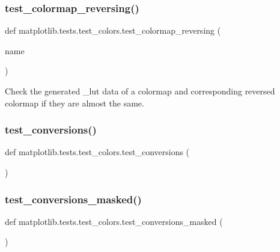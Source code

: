 \subsubsection{\texorpdfstring{test\+\_\+colormap\+\_\+reversing()}{test\_colormap\_reversing()}}
{\footnotesize\ttfamily def matplotlib.\+tests.\+test\+\_\+colors.\+test\+\_\+colormap\+\_\+reversing (\begin{DoxyParamCaption}\item[{}]{name }\end{DoxyParamCaption})}

\begin{DoxyVerb}Check the generated _lut data of a colormap and corresponding reversed
colormap if they are almost the same.
\end{DoxyVerb}
 \mbox{\label{namespacematplotlib_1_1tests_1_1test__colors_a6a0c77a21eb755f9a7ce717805c0ae95}} 
\subsubsection{\texorpdfstring{test\+\_\+conversions()}{test\_conversions()}}
{\footnotesize\ttfamily def matplotlib.\+tests.\+test\+\_\+colors.\+test\+\_\+conversions (\begin{DoxyParamCaption}{ }\end{DoxyParamCaption})}

\mbox{\label{namespacematplotlib_1_1tests_1_1test__colors_aa8f94b7a848ea5556dbd953fb7dc6ffe}} 
\subsubsection{\texorpdfstring{test\+\_\+conversions\+\_\+masked()}{test\_conversions\_masked()}}
{\footnotesize\ttfamily def matplotlib.\+tests.\+test\+\_\+colors.\+test\+\_\+conversions\+\_\+masked (\begin{DoxyParamCaption}{ }\end{DoxyParamCaption})}

